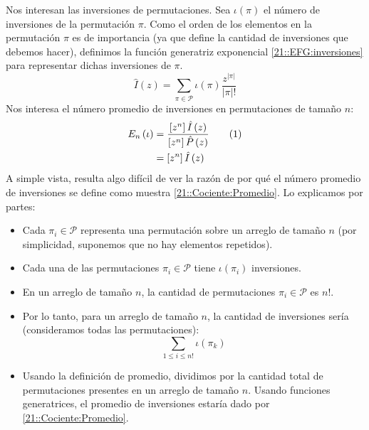 \documentclass[english, spanish, fleqn, 10pt]{article}
\numberwithin{equation}{section}
\newcommand{\nparentesis}[1]{\left( #1 \right)}
\newcommand{\nabsoluto}[1]{\left| #1 \right|}
\newcommand{\ncorchetes}[1]{\left[ #1 \right]}
\theoremstyle{definition}
\newcommand\numberthis{\addtocounter{equation}{1}\tag{\theequation}}
\begin{document}
Nos interesan las inversiones de permutaciones. Sea $\iota\nparentesis{\pi}$ el número de inversiones de la permutación $\pi$. Como el orden de los elementos en la permutación $\pi$ es de importancia (ya que define la cantidad de inversiones que debemos hacer), definimos la función generatriz exponencial \eqref{21::EFG:inversiones} para representar dichas inversiones de $\pi$.
\begin{equation}\label{21::EFG:inversiones}
\hat I \nparentesis{z} = \sum_{\pi \in \mathcal{P}} \iota\nparentesis{\pi} \dfrac{z^{\nabsoluto{\pi}}}{\nabsoluto{\pi}!}
\end{equation}
Nos interesa el número promedio de inversiones en permutaciones de tamaño $n$:
\begin{align*}
E_n\nparentesis{\iota} &= \dfrac{\ncorchetes{z^n}\hat I \nparentesis{z}}{\ncorchetes{z^n}\hat P \nparentesis{z}}\numberthis\label{21::Cociente:Promedio}\\
&= \ncorchetes{z^n}\hat I \nparentesis{z}
\end{align*}
A simple vista, resulta algo difícil de ver la razón de por qué el número promedio de inversiones se define como muestra \eqref{21::Cociente:Promedio}. Lo explicamos por partes:
\begin{itemize}
	\item Cada $\pi_i \in \mathcal{P}$ representa una permutación sobre un arreglo de tamaño $n$ (por simplicidad, suponemos que no hay elementos repetidos).
	
	\item Cada una de las permutaciones $\pi_i \in \mathcal{P}$ tiene $\iota \nparentesis{\pi_i}$ inversiones.
	
	\item En un arreglo de tamaño $n$, la cantidad de permutaciones $\pi_i \in \mathcal P$ es $n!$. 
	
	\item Por lo tanto, para un arreglo de tamaño $n$, la cantidad de inversiones sería (consideramos todas las permutaciones):
	\begin{equation}
	\sum _{1 \leq i \leq n!} \iota \nparentesis{\pi _k}
	\end{equation}
	
	\item Usando la definición de promedio, dividimos por la cantidad total de permutaciones presentes en un arreglo de tamaño $n$. Usando funciones generatrices, el promedio de inversiones estaría dado por \eqref{21::Cociente:Promedio}.
\end{itemize}
\end{document}
